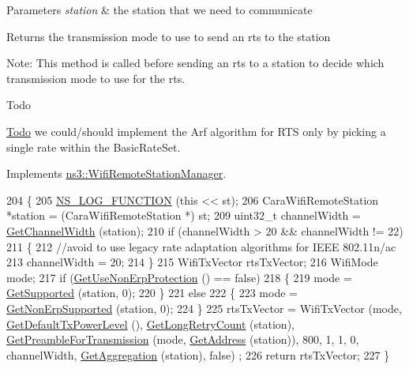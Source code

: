 \begin{DoxyParams}{Parameters}
{\em station} & the station that we need to communicate\\
\hline
\end{DoxyParams}
\begin{DoxyReturn}{Returns}
the transmission mode to use to send an rts to the station
\end{DoxyReturn}
Note\+: This method is called before sending an rts to a station to decide which transmission mode to use for the rts. \begin{DoxyRefDesc}{Todo}
\item[\hyperlink{todo__todo000170}{Todo}]we could/should implement the Arf algorithm for R\+TS only by picking a single rate within the Basic\+Rate\+Set. \end{DoxyRefDesc}


Implements \hyperlink{classns3_1_1WifiRemoteStationManager_abf44eccb31d4b1b58644fd6721d132c9}{ns3\+::\+Wifi\+Remote\+Station\+Manager}.


\begin{DoxyCode}
204 \{
205   \hyperlink{log-macros-disabled_8h_a90b90d5bad1f39cb1b64923ea94c0761}{NS\_LOG\_FUNCTION} (\textcolor{keyword}{this} << st);
206   CaraWifiRemoteStation *station = (CaraWifiRemoteStation *) st;
209   uint32\_t channelWidth = \hyperlink{classns3_1_1WifiRemoteStationManager_a918213c5b9fa629c4986f6d90521bbd4}{GetChannelWidth} (station);
210   \textcolor{keywordflow}{if} (channelWidth > 20 && channelWidth != 22)
211     \{
212       \textcolor{comment}{//avoid to use legacy rate adaptation algorithms for IEEE 802.11n/ac}
213       channelWidth = 20;
214     \}
215   WifiTxVector rtsTxVector;
216   WifiMode mode;
217   \textcolor{keywordflow}{if} (\hyperlink{classns3_1_1WifiRemoteStationManager_a2d3d93f08995e554960a177a52f90f2f}{GetUseNonErpProtection} () == \textcolor{keyword}{false})
218     \{
219       mode = \hyperlink{classns3_1_1WifiRemoteStationManager_a995c8bae0d84b168fd3e8bc9ecaacdd4}{GetSupported} (station, 0);
220     \}
221   \textcolor{keywordflow}{else}
222     \{
223       mode = \hyperlink{classns3_1_1WifiRemoteStationManager_a3df8f1931f1fce653e5990a2821b44c6}{GetNonErpSupported} (station, 0);
224     \}
225   rtsTxVector = WifiTxVector (mode, \hyperlink{classns3_1_1WifiRemoteStationManager_acff2fc859ee6b4c66ea7a83dd075b5d6}{GetDefaultTxPowerLevel} (), 
      \hyperlink{classns3_1_1WifiRemoteStationManager_aac10b1403fb0bd670f8a8bd6d7e48304}{GetLongRetryCount} (station), \hyperlink{classns3_1_1WifiRemoteStationManager_a0f44967cbd7488baada4802ebc642110}{GetPreambleForTransmission} (mode, 
      \hyperlink{classns3_1_1WifiRemoteStationManager_ac9ccc8c514bd8d2af05c290e63461a2a}{GetAddress} (station)), 800, 1, 1, 0, channelWidth, \hyperlink{classns3_1_1WifiRemoteStationManager_a5421c8d510cb16eebeac9f2ea9dd73c3}{GetAggregation} (station), \textcolor{keyword}{false})
      ;
226   \textcolor{keywordflow}{return} rtsTxVector;
227 \}
\end{DoxyCode}


